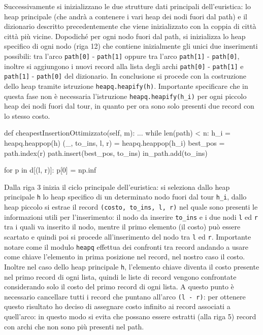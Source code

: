 \documentclass[a4paper,12pt]{report}
\begin{document}
Successivamente si inizializzano le due strutture dati principali dell'euristica: lo heap principale (che andrà a contenere i vari heap dei nodi fuori dal path) e il dizionario descritto precedentemente che viene inizializzato con la coppia di città città più vicine. Dopodiché per ogni nodo fuori dal path, si inizializza lo heap specifico di ogni nodo (riga 12) che contiene inizialmente gli unici due inserimenti possibili: tra l'arco \lstinline!path[0]! - \lstinline!path[1]! oppure tra l'arco \lstinline!path[1]! - \lstinline!path[0]!, inoltre si aggiungono i nuovi record alla lista degli archi \lstinline!path[0]! - \lstinline!path[1]! e \lstinline!path[1]! - \lstinline!path[0]! del dizionario. In conclusione si procede con la costruzione dello heap tramite istruzione \lstinline!heapq.heapify(h)!. Importante specificare che in questa fase non è necessaria l'istruzione \lstinline!heapq.heapify(h_i)! per ogni piccolo heap dei nodi fuori dal tour, in quanto per ora sono solo presenti due record con lo stesso costo.
\begin{python}
def cheapestInsertionOttimizzato(self, m):
  ...
  while len(path) < n:
    h_i = heapq.heappop(h)
    (_, to_ins, l, r) = heapq.heappop(h_i)
    best_pos = path.index(r)
    path.insert(best_pos, to_ins)
    in_path.add(to_ins)

    for p in d[(l, r)]:
      p[0] = np.inf
\end{python}
Dalla riga 3 inizia il ciclo principale dell'euristica: si seleziona dallo heap principale \lstinline!h! lo heap specifico di un determinato nodo fuori dal tour \lstinline!h_i!, dallo heap piccolo si estrae il record \lstinline!(costo, to_ins, l, r)! nel quale sono presenti le informazioni utili per l'inserimento: il nodo da inserire \lstinline!to_ins! e i due nodi \lstinline!l! ed \lstinline!r! tra i quali va inserito il nodo, mentre il primo elemento (il costo) può essere scartato e quindi poi si procede all'inserimento del nodo tra \lstinline!l! ed \lstinline!r!. Importante notare come il modulo \lstinline!heapq! effettua dei confronti tra record andando a usare come chiave l'elemento in prima posizione nel record, nel nostro caso il costo. Inoltre nel caso dello heap principale \lstinline!h!, l'elemento chiave diventa il costo presente nel primo record di ogni lista, quindi le liste di record vengono confrontate considerando solo il costo del primo record di ogni lista. A questo punto è necessario cancellare tutti i record che puntano all'arco \lstinline!(l - r)!: per ottenere questo risultato ho deciso di assegnare costo infinito ai record associati a quell'arco: in questo modo si evita che possano essere estratti (alla riga 5) record con archi che non sono più presenti nel path.
\end{document}
